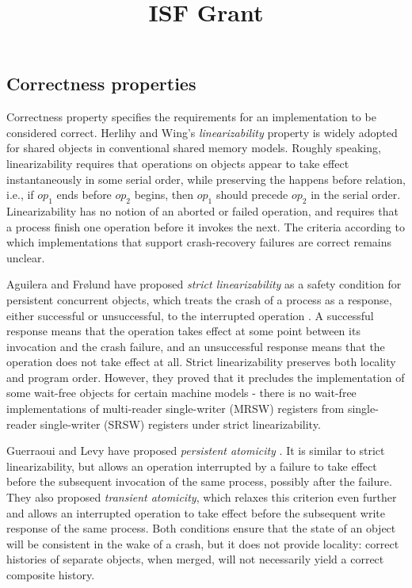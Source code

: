 \documentclass{article}
\title{ISF Grant}
\author{}
\begin{document}
\maketitle


\subsection{Correctness properties} \label{Correctness properties}
Correctness property specifies the requirements for an implementation to be considered correct. Herlihy and Wing’s \emph{linearizability} property \cite{DBLP:journals/toplas/HerlihyW90} is widely adopted for shared objects in conventional shared memory models.  Roughly speaking, linearizability requires that operations on objects appear to take effect instantaneously in some serial order, while preserving the happens before relation, i.e., if $op_1$ ends before $op_2$ begins, then $op_1$ should precede $op_2$ in the serial order. Linearizability has no notion of an aborted or failed operation, and requires that a process finish one operation before it invokes the next. The criteria according to which implementations that support crash-recovery failures are correct remains unclear.

Aguilera and Fr{\o}lund have proposed \emph{strict linearizability} as a safety condition for persistent concurrent objects, which treats the crash of a process as a response, either successful or unsuccessful, to the interrupted operation \cite{Aguilera2003StrictLA}. A successful response means that the operation takes effect at some point between its invocation and the crash failure, and an unsuccessful response means that the operation does not take effect at all. Strict linearizability preserves both locality and program order. However, they proved that it precludes the implementation of some wait-free objects for certain machine models - there is no wait-free implementations of multi-reader single-writer (MRSW) registers from single-reader single-writer (SRSW) registers under strict linearizability.

Guerraoui and Levy have proposed \emph{persistent atomicity} \cite{DBLP:conf/icdcs/GuerraouiL04}. It is similar to strict linearizability, but allows an operation interrupted by a failure to take effect before the subsequent invocation of the same process, possibly after the failure. They also proposed \emph{transient atomicity}, which relaxes this criterion even further and allows an interrupted operation to take effect before the subsequent write response of the same process. Both conditions ensure that the state of an object will be consistent in the wake of a crash, but it does not provide locality: correct histories of separate objects, when merged, will not necessarily yield a correct composite history.
\end{document}
